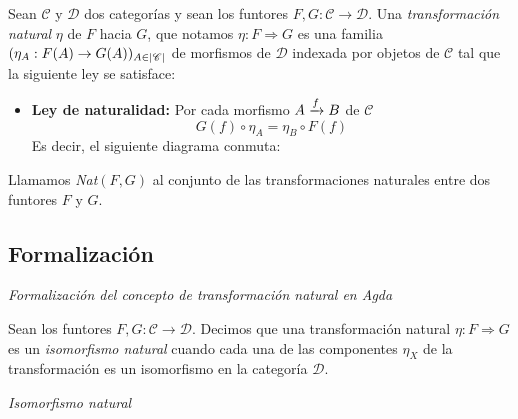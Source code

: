 \begin{definition}
  Sean $\mathscr{C}$ y $\mathscr{D}$ dos categorías y sean los funtores $F,G : \mathscr{C} \to \mathscr{D}$. Una {\it transformación natural} $\eta$ de $F$ hacia $G$, que notamos $\eta : F \Rightarrow G$ es una familia $(\flechaFlat{F(A)}{\eta_{A}}{G(A)})_{A \in \Obj{\C}}$ de morfismos de $\mathscr{D}$ indexada por objetos de $\mathscr{C}$ tal que la siguiente ley se satisface:
  \begin{itemize}\renewcommand{\labelitemi}{$\star$}
    \item {\bf Ley de naturalidad:} Por cada morfismo $\flecha{A}{f}{B}$ de $\mathscr{C}$ $$G(f) \circ \eta_{A} = \eta_{B} \circ F(f)$$
  Es decir, el siguiente diagrama conmuta:
  \begin{center}
  \xymatrixcolsep{3pc} \xymatrixrowsep{3pc}
  \centerline{}
  \end{center}
  \end{itemize}
\end{definition}

Llamamos {\it Nat}$(F,G)$ al conjunto de las transformaciones naturales entre dos funtores $F$ y $G$.

\subsection{Formalización}

\begin{agdacode}{\it Formalización del concepto de transformación natural en Agda} \label{code:nt}

\end{agdacode}


\begin{definition} Sean los funtores $F,G : \mathscr{C} \to \mathscr{D}$. Decimos que una transformación natural $\eta : F \Rightarrow G $ es un {\it isomorfismo natural} cuando cada una de las componentes $\eta_{X}$ de la transformación es un isomorfismo en la categoría $\mathscr{D}$.
\end{definition}

\begin{agdacode}{\it Isomorfismo natural} \label{code:natiso}

\end{agdacode}


